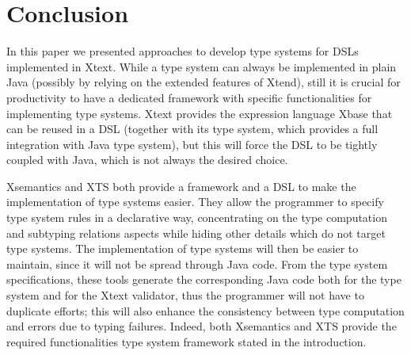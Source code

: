 \section{Conclusion}
\label{sec:conclusion}

In this paper we presented approaches to develop type systems for DSLs
implemented in Xtext.  While a type system can always be implemented in plain
Java (possibly by relying on the extended features of Xtend), still it is
crucial for productivity to have a dedicated framework with specific
functionalities for implementing type systems.  Xtext provides the expression
language Xbase that can be reused in a DSL (together with its type system,
which provides a full integration with Java type system), but this will force
the DSL to be tightly coupled with Java, which is not always the desired choice.

Xsemantics and XTS both provide a framework and a DSL to make the implementation
of type systems easier.  They allow the programmer to specify type system
rules in a declarative way, concentrating on the type computation and subtyping
relations aspects while hiding other details which do not target type systems.
The implementation of type systems will then be easier to maintain, since it
will not be spread through Java code.  From the type system specifications,
these tools generate the corresponding Java code both for the type system and
for the Xtext validator, thus the programmer will not have to duplicate efforts;
this will also enhance the consistency between type computation and errors due
to typing failures.  Indeed, both Xsemantics and XTS provide the
required functionalities type system framework stated in the introduction.

